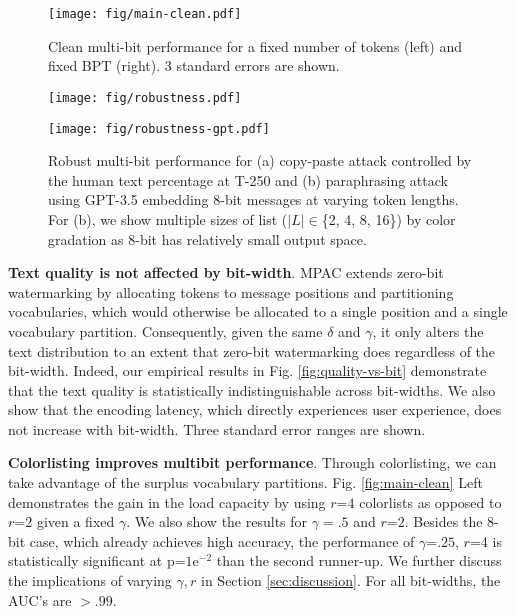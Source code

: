 \begin{figure}
    \centering
    \texttt{[image: fig/main-clean.pdf]}
    \caption{Clean multi-bit performance for a fixed number of tokens (left) and fixed BPT (right). 3 standard errors are shown.}\label{fig:main-clean}
    
    
\begin{minipage}[h]{0.79\textwidth}
    \centering
    \texttt{[image: fig/robustness.pdf]}
    \vspace{-8mm}
    \subcaption{}\label{fig:robust-cp}
\end{minipage}
\hfill
\begin{minipage}[h]{0.2\textwidth}
    \centering
    \texttt{[image: fig/robustness-gpt.pdf]}
    \vspace{-8mm}
    \subcaption{}\label{fig:robust-gpt}   
\end{minipage}
\vspace{-3mm}
\caption{Robust multi-bit performance for (a) copy-paste attack controlled by the human text percentage at T-250 and (b) paraphrasing attack using GPT-3.5 embedding 8-bit messages at varying token lengths. For (b), we show multiple sizes of list ($|L|\in$\{2, 4, 8, 16\}) by color gradation as 8-bit has relatively small output space.}
\label{fig:robust}
\vspace{-3mm}
\end{figure}

\noindent\textbf{Text quality is not affected by bit-width}. MPAC extends zero-bit watermarking by allocating tokens to message positions and partitioning vocabularies, which would otherwise be allocated to a single position and a single vocabulary partition. Consequently, given the same $\delta$ and $\gamma$, it only alters the text distribution to an extent that zero-bit watermarking does regardless of the bit-width. Indeed, our empirical results in Fig. \ref{fig:quality-vs-bit} demonstrate that the text quality is statistically indistinguishable across bit-widths. We also show that the encoding latency, which directly experiences user experience, does not increase with bit-width. Three standard error ranges are shown.

\noindent\textbf{Colorlisting improves multibit performance}. Through colorlisting, we can take advantage of the surplus vocabulary partitions. Fig. \ref{fig:main-clean} Left demonstrates the gain in the load capacity by using $r$=$4$ colorlists as opposed to $r$=$2$ given a fixed $\gamma$. We also show the results for $\gamma=.5$ and $r$=$2$. Besides the 8-bit case, which already achieves high accuracy, the performance of $\gamma$=$.25$, $r$=$4$ is statistically significant at p=$1\mathrm{e}^{-2}$ than the second runner-up. We further discuss the implications of varying $\gamma,r$ in Section \ref{sec:discussion}. For all bit-widths, the AUC's are $>.99$.

